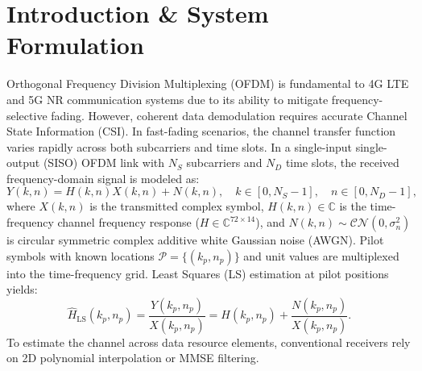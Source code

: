 \documentclass[10pt,a4paper]{article}
\begin{document}
\section{Introduction \& System Formulation}
\label{sec:intro}
Orthogonal Frequency Division Multiplexing (OFDM) is fundamental to 4G LTE and 5G NR communication systems due to its ability to mitigate frequency-selective fading. However, coherent data demodulation requires accurate Channel State Information (CSI). In fast-fading scenarios, the channel transfer function varies rapidly across both subcarriers and time slots. In a single-input single-output (SISO) OFDM link with $N_S$ subcarriers and $N_D$ time slots, the received frequency-domain signal is modeled as:
\begin{equation}
\label{eq:ofdm_rx}
Y(k, n) = H(k, n) X(k, n) + N(k, n), \quad k \in [0, N_S - 1], \quad n \in [0, N_D - 1],
\end{equation}
where $X(k, n)$ is the transmitted complex symbol, $H(k, n) \in \mathbb{C}$ is the time-frequency channel frequency response ($H \in \mathbb{C}^{72 \times 14}$), and $N(k, n) \sim \mathcal{CN}(0, \sigma_n^2)$ is circular symmetric complex additive white Gaussian noise (AWGN). Pilot symbols with known locations $\mathcal{P} = \{(k_p, n_p)\}$ and unit values are multiplexed into the time-frequency grid. Least Squares (LS) estimation at pilot positions yields:
\begin{equation}
\label{eq:ls_est}
\hat{H}_{\text{LS}}(k_p, n_p) = \frac{Y(k_p, n_p)}{X(k_p, n_p)} = H(k_p, n_p) + \frac{N(k_p, n_p)}{X(k_p, n_p)}.
\end{equation}
To estimate the channel across data resource elements, conventional receivers rely on 2D polynomial interpolation or MMSE filtering.
\end{document}
